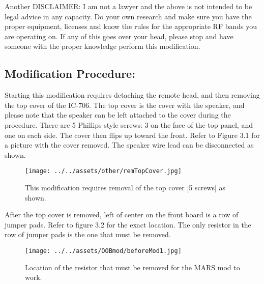 \documentclass{report}
\begin{document}
\hspace{\parindent}Another DISCLAIMER: I am not a lawyer and the above is not intended to be legal advice in any 
capacity. Do your own research and make sure you have the proper equipment, licenses and know the rules for the 
appropriate RF bands you are operating on. If any of this goes over your head, please stop and have someone with 
the proper knowledge perform this modification.

\begin{center}
    \chapter{\textbf{Modification Procedure:}}
\end{center}

\hspace{\parindent}Starting this modification requires detaching the remote head, and then removing the top cover 
of the IC-706. The top cover is the cover with the speaker, and please note that the speaker can be left attached 
to the cover during the procedure. There are 5 Phillips-style screws: 3 on the face of the top panel, and one on
each side. The cover then flips up toward the front. Refer to Figure 3.1 for a picture with the cover removed.
The speaker wire lead can be disconnected as shown.

\begin{figure}[H] %
    \centering %
    \texttt{[image: ../../assets/other/remTopCover.jpg]} %
    \caption{This modification requires removal of the top cover [5 screws] as shown.} %
\end{figure}

\newpage

\hspace{\parindent}After the top cover is removed, left of center on the front board is a row of jumper pads. 
Refer to figure 3.2 for the exact location. The only resistor in the row of jumper pads is the one that must be 
removed.

\begin{figure}[H] %
    \centering %
    \texttt{[image: ../../assets/OOBmod/beforeMod1.jpg]} %
    \caption{Location of the resistor that must be removed for the MARS mod to work.} %
\end{figure}
\end{document}
